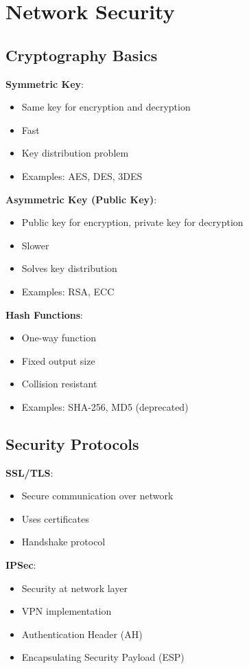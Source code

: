 \documentclass[12pt,a4paper]{report}
\begin{document}
\section{Network Security}

\subsection{Cryptography Basics}
\begin{concept}
\textbf{Symmetric Key}:
\begin{itemize}
    \item Same key for encryption and decryption
    \item Fast
    \item Key distribution problem
    \item Examples: AES, DES, 3DES
\end{itemize}

\textbf{Asymmetric Key (Public Key)}:
\begin{itemize}
    \item Public key for encryption, private key for decryption
    \item Slower
    \item Solves key distribution
    \item Examples: RSA, ECC
\end{itemize}

\textbf{Hash Functions}:
\begin{itemize}
    \item One-way function
    \item Fixed output size
    \item Collision resistant
    \item Examples: SHA-256, MD5 (deprecated)
\end{itemize}
\end{concept}

\subsection{Security Protocols}
\begin{concept}
\textbf{SSL/TLS}:
\begin{itemize}
    \item Secure communication over network
    \item Uses certificates
    \item Handshake protocol
\end{itemize}

\textbf{IPSec}:
\begin{itemize}
    \item Security at network layer
    \item VPN implementation
    \item Authentication Header (AH)
    \item Encapsulating Security Payload (ESP)
\end{itemize}
\end{concept}
\end{document}
